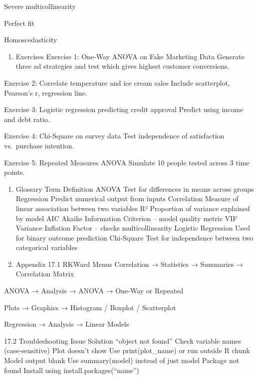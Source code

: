 \documentclass[
  letterpaper,
  DIV=11,
  numbers=noendperiod]{scrreprt}
\providecommand{\tightlist}{%
  \setlength{\itemsep}{0pt}\setlength{\parskip}{0pt}}
\begin{document}
Severe multicollinearity

Perfect fit

Homoscedasticity

\begin{enumerate}
\def\labelenumi{\arabic{enumi}.}
\setcounter{enumi}{14}
\tightlist
\item
  Exercises Exercise 1: One-Way ANOVA on Fake Marketing Data Generate
  three ad strategies and test which gives highest customer conversions.
\end{enumerate}

Exercise 2: Correlate temperature and ice cream sales Include
scatterplot, Pearson's r, regression line.

Exercise 3: Logistic regression predicting credit approval Predict using
income and debt ratio.

Exercise 4: Chi-Square on survey data Test independence of satisfaction
vs.~purchase intention.

Exercise 5: Repeated Measures ANOVA Simulate 10 people tested across 3
time points.

\begin{enumerate}
\def\labelenumi{\arabic{enumi}.}
\setcounter{enumi}{15}
\item
  Glossary Term Definition ANOVA Test for differences in means across
  groups Regression Predict numerical output from inputs Correlation
  Measure of linear association between two variables R² Proportion of
  variance explained by model AIC Akaike Information Criterion -- model
  quality metric VIF Variance Inflation Factor -- checks
  multicollinearity Logistic Regression Used for binary outcome
  prediction Chi-Square Test for independence between two categorical
  variables
\item
  Appendix 17.1 RKWard Menus Correlation → Statistics → Summaries →
  Correlation Matrix
\end{enumerate}

ANOVA → Analysis → ANOVA → One-Way or Repeated

Plots → Graphics → Histogram / Boxplot / Scatterplot

Regression → Analysis → Linear Models

17.2 Troubleshooting Issue Solution ``object not found'' Check variable
names (case-sensitive) Plot doesn't show Use print(plot\_name) or run
outside R chunk Model output blank Use summary(model) instead of just
model Package not found Install using install.packages(``name'')

\end{document}
